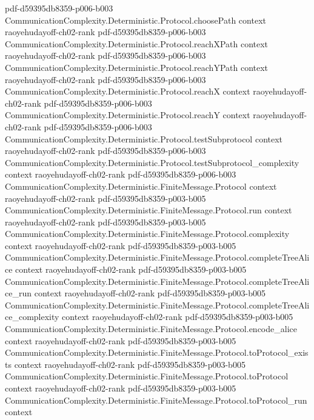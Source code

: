 \begin{theorem}
  {pdf-d59395db8359-p006-b003}
\proofstep
  {CommunicationComplexity.Deterministic.Protocol.choosePath}
  {context}
  {raoyehudayoff-ch02-rank}
  {pdf-d59395db8359-p006-b003}
\proofstep
  {CommunicationComplexity.Deterministic.Protocol.reachXPath}
  {context}
  {raoyehudayoff-ch02-rank}
  {pdf-d59395db8359-p006-b003}
\proofstep
  {CommunicationComplexity.Deterministic.Protocol.reachYPath}
  {context}
  {raoyehudayoff-ch02-rank}
  {pdf-d59395db8359-p006-b003}
\proofstep
  {CommunicationComplexity.Deterministic.Protocol.reachX}
  {context}
  {raoyehudayoff-ch02-rank}
  {pdf-d59395db8359-p006-b003}
\proofstep
  {CommunicationComplexity.Deterministic.Protocol.reachY}
  {context}
  {raoyehudayoff-ch02-rank}
  {pdf-d59395db8359-p006-b003}
\proofstep
  {CommunicationComplexity.Deterministic.Protocol.testSubprotocol}
  {context}
  {raoyehudayoff-ch02-rank}
  {pdf-d59395db8359-p006-b003}
\proofstep
  {CommunicationComplexity.Deterministic.Protocol.testSubprotocol_complexity}
  {context}
  {raoyehudayoff-ch02-rank}
  {pdf-d59395db8359-p006-b003}
\proofstep
  {CommunicationComplexity.Deterministic.FiniteMessage.Protocol}
  {context}
  {raoyehudayoff-ch02-rank}
  {pdf-d59395db8359-p003-b005}
\proofstep
  {CommunicationComplexity.Deterministic.FiniteMessage.Protocol.run}
  {context}
  {raoyehudayoff-ch02-rank}
  {pdf-d59395db8359-p003-b005}
\proofstep
  {CommunicationComplexity.Deterministic.FiniteMessage.Protocol.complexity}
  {context}
  {raoyehudayoff-ch02-rank}
  {pdf-d59395db8359-p003-b005}
\proofstep
  {CommunicationComplexity.Deterministic.FiniteMessage.Protocol.completeTreeAlice}
  {context}
  {raoyehudayoff-ch02-rank}
  {pdf-d59395db8359-p003-b005}
\proofstep
  {CommunicationComplexity.Deterministic.FiniteMessage.Protocol.completeTreeAlice_run}
  {context}
  {raoyehudayoff-ch02-rank}
  {pdf-d59395db8359-p003-b005}
\proofstep
  {CommunicationComplexity.Deterministic.FiniteMessage.Protocol.completeTreeAlice_complexity}
  {context}
  {raoyehudayoff-ch02-rank}
  {pdf-d59395db8359-p003-b005}
\proofstep
  {CommunicationComplexity.Deterministic.FiniteMessage.Protocol.encode_alice}
  {context}
  {raoyehudayoff-ch02-rank}
  {pdf-d59395db8359-p003-b005}
\proofstep
  {CommunicationComplexity.Deterministic.FiniteMessage.Protocol.toProtocol_exists}
  {context}
  {raoyehudayoff-ch02-rank}
  {pdf-d59395db8359-p003-b005}
\proofstep
  {CommunicationComplexity.Deterministic.FiniteMessage.Protocol.toProtocol}
  {context}
  {raoyehudayoff-ch02-rank}
  {pdf-d59395db8359-p003-b005}
\proofstep
  {CommunicationComplexity.Deterministic.FiniteMessage.Protocol.toProtocol_run}
  {context}

\end{theorem}
